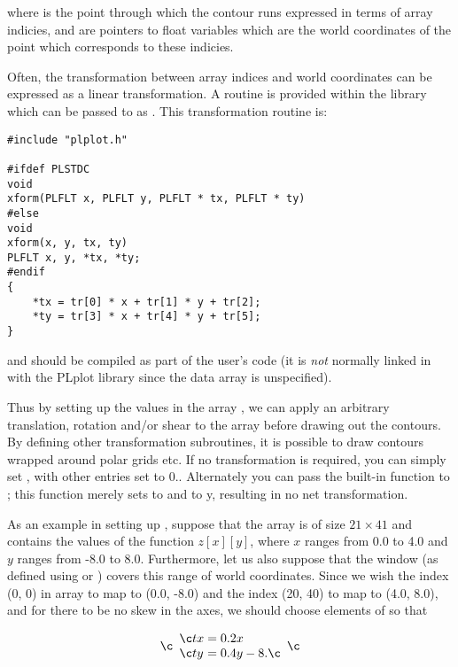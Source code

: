 
where  is the point through which the contour runs
expressed in terms of array indicies, and  are pointers
to float variables which are the world coordinates of the point which
corresponds to these indicies.

Often, the transformation between array indices and world coordinates can be
expressed as a linear transformation.  A routine is provided within the
library which can be passed to  as .  This
transformation routine is:

\begin{verbatim}
#include "plplot.h"

#ifdef PLSTDC
void 
xform(PLFLT x, PLFLT y, PLFLT * tx, PLFLT * ty)
#else
void 
xform(x, y, tx, ty)
PLFLT x, y, *tx, *ty;
#endif
{
    *tx = tr[0] * x + tr[1] * y + tr[2];
    *ty = tr[3] * x + tr[4] * y + tr[5];
}
\end{verbatim}

and should be compiled as part of the user's code (it is \emph{not}
normally linked in with the PLplot library since the  data
array is unspecified).

Thus by setting up the values in the array , we can apply an
arbitrary translation, rotation and/or shear to the array before drawing
out the contours.  By defining other transformation subroutines, it is
possible to draw contours wrapped around polar grids etc.  If no
transformation is required, you can simply set , with other entries set to $0.$.  Alternately you can pass the
built-in function  to ; this function merely
sets  to  and  to {y}, resulting in no net
transformation.

As an example in setting up , suppose that the array 
is of size $21 \times 41$ and contains the values of the function
$z[x][y]$, where $x$ ranges from 0.0 to 4.0 and $y$ ranges from -8.0 to
8.0.  Furthermore, let us also suppose that the window (as defined using
 or ) covers this range of world coordinates.
Since we wish the index (0, 0) in array  to map to (0.0, -8.0)
and the index (20, 40) to map to (4.0, 8.0), and for there to be no skew
in the axes, we should choose elements of  so that

\c \[
\c    \begin{array}{l@{\; = \;}l}
\c    tx & 0.2x \\
\c    ty & 0.4y - 8.
\c    \end{array}
\c \]

